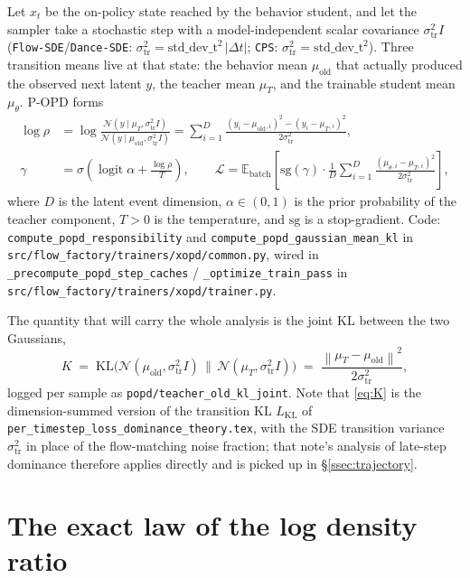 \documentclass[11pt,a4paper]{article}
\newcommand{\E}{\mathbb{E}}
\newcommand{\norm}[1]{\left\lVert #1 \right\rVert}
\newcommand{\dt}{\Delta t}
\newcommand{\KL}{\mathrm{KL}}
\newcommand{\N}{\mathcal{N}}
\newcommand{\sgn}{\mathrm{sg}}
\newcommand{\str}{\sigma_{\mathrm{tr}}}
\newcommand{\muold}{\mu_{\mathrm{old}}}
\newcommand{\muT}{\mu_{T}}
\newcommand{\mus}{\mu_{\theta}}
\begin{document}
Let $x_t$ be the on-policy state reached by the behavior student, and let the sampler take a
stochastic step with a model-independent scalar covariance $\str^2 I$
(\texttt{Flow-SDE}/\texttt{Dance-SDE}: $\str^2=\mathrm{std\_dev\_t}^2\,\lvert\dt\rvert$;
\texttt{CPS}: $\str^2=\mathrm{std\_dev\_t}^2$). Three transition means live at that state: the
behavior mean $\muold$ that actually produced the observed next latent $y$, the teacher mean
$\muT$, and the trainable student mean $\mus$. P-OPD forms
\begin{align}
\log\rho &= \log\frac{\N(y\mid\muT,\str^2 I)}{\N(y\mid\muold,\str^2 I)}
          = \sum_{i=1}^{D}\frac{(y_i-\muold{}_{,i})^2-(y_i-\muT{}_{,i})^2}{2\str^2},
\label{eq:logrho}\\[0.3em]
\gamma &= \sigma\!\left(\operatorname{logit}\alpha + \frac{\log\rho}{T}\right),
\qquad
\mathcal{L} = \E_{\mathrm{batch}}\!\left[\sgn(\gamma)\cdot
  \frac{1}{D}\sum_{i=1}^{D}\frac{(\mus{}_{,i}-\muT{}_{,i})^2}{2\str^2}\right],
\label{eq:gate}
\end{align}
where $D$ is the latent event dimension, $\alpha\in(0,1)$ is the prior probability of the teacher
component, $T>0$ is the temperature, and $\sgn$ is a stop-gradient. Code:
\texttt{compute\_popd\_responsibility} and \texttt{compute\_popd\_gaussian\_mean\_kl} in
\texttt{src/flow\_factory/trainers/xopd/common.py}, wired in
\texttt{\_precompute\_popd\_step\_caches} / \texttt{\_optimize\_train\_pass} in
\texttt{src/flow\_factory/trainers/xopd/trainer.py}.

The quantity that will carry the whole analysis is the joint KL between the two Gaussians,
\begin{equation}
K \;=\; \KL\big(\N(\muold,\str^2 I)\,\big\|\,\N(\muT,\str^2 I)\big)
  \;=\; \frac{\norm{\muT-\muold}^2}{2\str^2},
\label{eq:K}
\end{equation}
logged per sample as \texttt{popd/teacher\_old\_kl\_joint}. Note that \eqref{eq:K} is the
dimension-summed version of the transition KL $L_{\mathrm{KL}}$ of
\texttt{per\_timestep\_loss\_dominance\_theory.tex}, with the SDE transition variance
$\str^2$ in place of the flow-matching noise fraction; that note's analysis of late-step
dominance therefore applies directly and is picked up in \S\ref{ssec:trajectory}.

\section{The exact law of the log density ratio}
\label{sec:theory}
\end{document}
